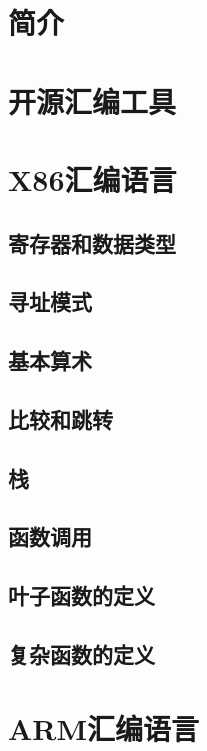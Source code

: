 \documentclass[cn,11pt,chinese]{elegantbook}
\begin{document}
\section{简介}

\section{开源汇编工具}

\section{X86汇编语言}

\subsection{寄存器和数据类型}

\subsection{寻址模式}

\subsection{基本算术}

\subsection{比较和跳转}

\subsection{栈}

\subsection{函数调用}

\subsection{叶子函数的定义}

\subsection{复杂函数的定义}

\section{ARM汇编语言}
\end{document}
